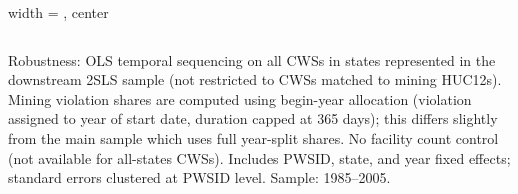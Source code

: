 \begin{table}[htbp]
\begin{adjustbox}{width = \textwidth, center}
\begin{tabular}{lcccc}
         \bottomrule
         
      \end{tabular}
      
      
      
   \end{adjustbox}
      {\tiny\linespread{1}\selectfont \par \raggedright 
   Robustness: OLS temporal sequencing on all CWSs in states represented in the downstream 2SLS sample (not restricted to CWSs matched to mining HUC12s). Mining violation shares are computed using begin-year allocation (violation assigned to year of start date, duration capped at 365 days); this differs slightly from the main sample which uses full year-split shares. No facility count control (not available for all-states CWSs). Includes PWSID, state, and year fixed effects; standard errors clustered at PWSID level. Sample: 1985--2005.}
   
\end{table}


